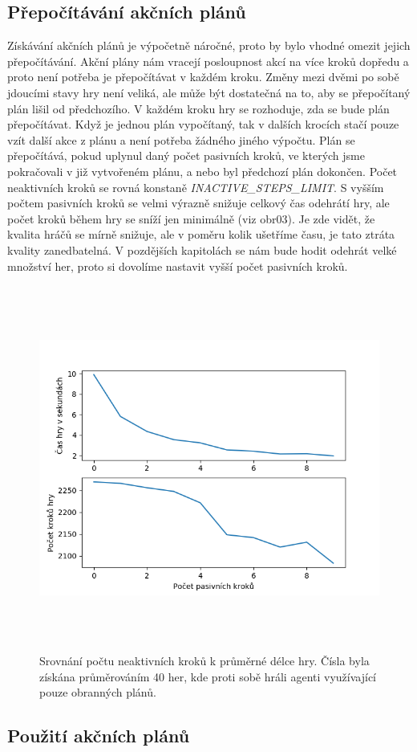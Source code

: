 \subsection{Přepočítávání akčních plánů}
Získávání akčních plánů je výpočetně náročné, proto by bylo vhodné omezit jejich přepočítávání. Akční plány nám vracejí posloupnost akcí na více kroků dopředu a proto není potřeba je přepočítávat v každém kroku.
Změny mezi dvěmi po sobě jdoucími stavy hry není veliká, ale může být dostatečná na to, aby se přepočítaný plán lišil od předchozího.
V každém kroku hry se rozhoduje, zda se bude plán přepočítávat. Když je jednou plán vypočítaný, tak v dalších krocích stačí pouze vzít další akce z plánu a není potřeba žádného jiného výpočtu.
Plán se přepočítává, pokud uplynul daný počet pasivních kroků, ve kterých jsme pokračovali v již vytvořeném plánu, a nebo byl předchozí plán dokončen.
Počet neaktivních kroků se rovná konstaně \emph{\uppercase{inactive\_steps\_limit}}. 
S vyšším počtem pasivních kroků se velmi výrazně snižuje celkový čas odehrátí hry, ale počet kroků během hry se sníží jen minimálně (viz obr03).
Je zde vidět, že kvalita hráčů se mírně snižuje, ale v poměru kolik ušetříme času, je tato ztráta kvality zanedbatelná.
V pozdějších kapitolách se nám bude hodit odehrát velké množství her, proto si dovolíme nastavit vyšší počet pasivních kroků.


\begin{figure}[hp]

\includegraphics[width=150mm, height=120mm]{./Obrazky/Inactive_steps_comparison2.png}
\caption{Srovnání počtu neaktivních kroků k průměrné délce hry. Čísla byla získána průměrováním 40 her, kde proti sobě hráli agenti využívající pouze obranných plánů.}
\label{obr03:}
\end{figure}

\subsection{Použití akčních plánů}



